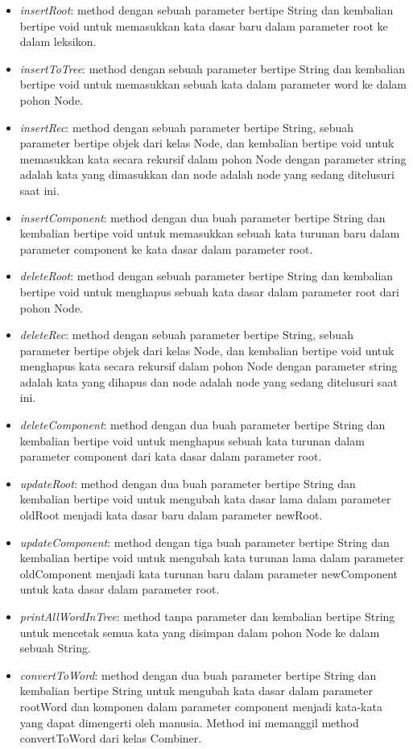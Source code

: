 \begin{itemize}
	\item \textit{insertRoot}: method dengan sebuah parameter bertipe String dan kembalian bertipe void untuk memasukkan kata dasar baru dalam parameter root ke dalam leksikon.
	\item \textit{insertToTree}: method dengan sebuah parameter bertipe String dan kembalian bertipe void untuk memasukkan sebuah kata dalam parameter word ke dalam pohon Node.
	\item \textit{insertRec}: method dengan sebuah parameter bertipe String, sebuah parameter bertipe objek dari kelas Node, dan kembalian bertipe void untuk memasukkan kata secara rekursif dalam pohon Node dengan parameter string adalah kata yang dimasukkan dan node adalah node yang sedang ditelusuri saat ini.
	\item \textit{insertComponent}: method dengan dua buah parameter bertipe String dan kembalian bertipe void untuk memasukkan sebuah kata turunan baru dalam parameter component ke kata dasar dalam parameter root.
	\item \textit{deleteRoot}: method dengan sebuah parameter bertipe String dan kembalian bertipe void untuk menghapus sebuah kata dasar dalam parameter root dari pohon Node.
	\item \textit{deleteRec}: method dengan sebuah parameter bertipe String, sebuah parameter bertipe objek dari kelas Node, dan kembalian bertipe void untuk menghapus kata secara rekursif dalam pohon Node dengan parameter string adalah kata yang dihapus dan node adalah node yang sedang ditelusuri saat ini.
	\item \textit{deleteComponent}: method dengan dua buah parameter bertipe String dan kembalian bertipe void untuk menghapus sebuah kata turunan dalam parameter component dari kata dasar dalam parameter root.
	\item \textit{updateRoot}: method dengan dua buah parameter bertipe String dan kembalian bertipe void untuk mengubah kata dasar lama dalam parameter oldRoot menjadi kata dasar baru dalam parameter newRoot.
	\item \textit{updateComponent}: method dengan tiga buah parameter bertipe String dan kembalian bertipe void untuk mengubah kata turunan lama dalam parameter oldComponent menjadi kata turunan baru dalam parameter newComponent untuk kata dasar dalam parameter root.
	\item \textit{printAllWordInTree}: method tanpa parameter dan kembalian bertipe String untuk mencetak semua kata yang disimpan dalam pohon Node ke dalam sebuah String.
	\item \textit{convertToWord}: method dengan dua buah parameter bertipe String dan kembalian bertipe String untuk mengubah kata dasar dalam parameter rootWord dan komponen dalam parameter component menjadi kata-kata yang dapat dimengerti oleh manusia. Method ini memanggil method convertToWord dari kelas Combiner.
\end{itemize}

